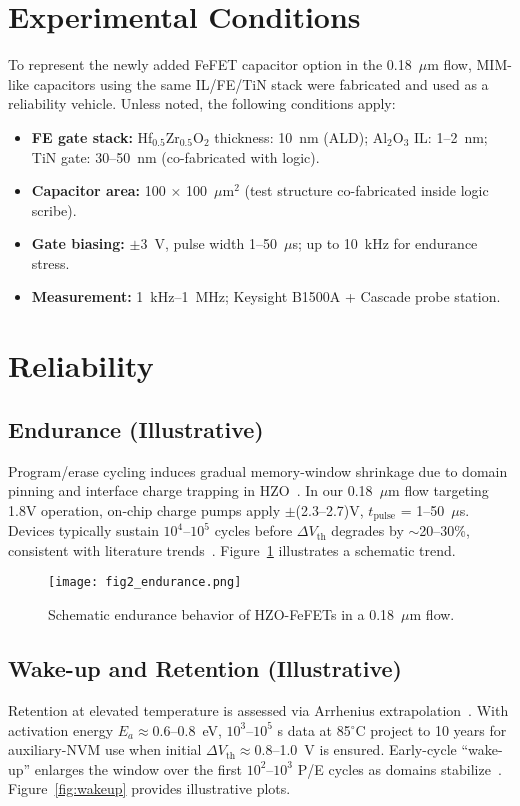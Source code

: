 \documentclass[conference]{IEEEtran}
\begin{document}
\section{Experimental Conditions}
To represent the newly added FeFET capacitor option in the 0.18~$\mu$m flow, MIM-like capacitors using the same IL/FE/TiN stack were fabricated and used as a reliability vehicle. Unless noted, the following conditions apply:
\begin{itemize}
  \item \textbf{FE gate stack:} Hf$_{0.5}$Zr$_{0.5}$O$_2$ thickness: 10~nm (ALD); Al$_2$O$_3$ IL: 1–2~nm; TiN gate: 30–50~nm (co-fabricated with logic).
  \item \textbf{Capacitor area:} 100 $\times$ 100~$\mu$m$^2$ (test structure co-fabricated inside logic scribe).
  \item \textbf{Gate biasing:} $\pm$3~V, pulse width 1–50~$\mu$s; up to 10~kHz for endurance stress.
  \item \textbf{Measurement:} 1~kHz–1~MHz; Keysight B1500A + Cascade probe station.
\end{itemize}

\section{Reliability}
\subsection{Endurance (Illustrative)}
Program/erase cycling induces gradual memory-window shrinkage due to domain pinning and interface charge trapping in HZO~\cite{Muller2015,Park2020}. In our 0.18~$\mu$m flow targeting 1.8V operation, on-chip charge pumps apply $\pm$(2.3–2.7)V, $t_\text{pulse}$ = 1–50~$\mu$s. Devices typically sustain $10^4$–$10^5$ cycles before $\Delta V_\text{th}$ degrades by $\sim$20–30\%, consistent with literature trends~\cite{Muller2015,Park2020}. Figure~\ref{fig:endurance} illustrates a schematic trend.

\begin{figure}[H]
\centering
\texttt{[image: fig2\_endurance.png]}
\caption{Schematic endurance behavior of HZO-FeFETs in a 0.18~$\mu$m flow.}
\label{fig:endurance}
\end{figure}

\subsection{Wake-up and Retention (Illustrative)}
Retention at elevated temperature is assessed via Arrhenius extrapolation~\cite{Yamazaki2018}. With activation energy $E_a \approx 0.6$–0.8~eV, $10^3$–$10^5$ s data at 85$^\circ$C project to 10 years for auxiliary-NVM use when initial $\Delta V_\text{th} \approx 0.8$–1.0~V is ensured. Early-cycle “wake-up” enlarges the window over the first $10^2$–$10^3$ P/E cycles as domains stabilize~\cite{BoeScke2011,Muller2012}. Figure~\ref{fig:wakeup} provides illustrative plots.
\end{document}
